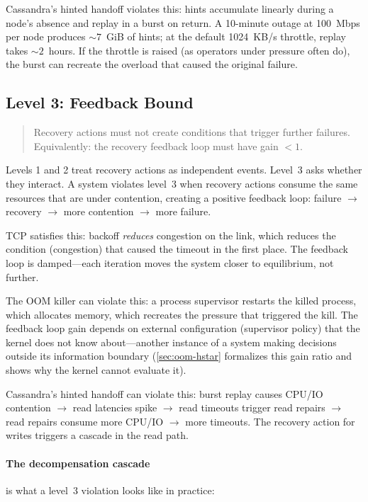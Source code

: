 \documentclass[11pt]{article}
\begin{document}
Cassandra's hinted handoff violates this: hints accumulate linearly during a
node's absence and replay in a burst on return. A 10-minute outage at 100~Mbps
per node produces ${\sim}7$~GiB of hints; at the default 1024~KB/s throttle,
replay takes ${\sim}2$~hours. If the throttle is raised (as operators under
pressure often do), the burst can recreate the overload that caused the original
failure.

\subsection{Level 3: Feedback Bound}

\begin{quote}
Recovery actions must not create conditions that trigger further failures.
Equivalently: the recovery feedback loop must have gain $< 1$.
\end{quote}

Levels 1 and 2 treat recovery actions as independent events. Level~3 asks
whether they interact. A system violates level~3 when recovery actions consume
the same resources that are under contention, creating a positive feedback loop:
failure $\to$ recovery $\to$ more contention $\to$ more failure.

TCP satisfies this: backoff \emph{reduces} congestion on the link, which reduces
the condition (congestion) that caused the timeout in the first place. The
feedback loop is damped---each iteration moves the system closer to equilibrium,
not further.

The OOM killer can violate this: a process supervisor restarts the killed
process, which allocates memory, which recreates the pressure that triggered the
kill. The feedback loop gain depends on external configuration (supervisor
policy) that the kernel does not know about---another instance of a system making
decisions outside its information boundary (\cref{sec:oom-hstar} formalizes
this gain ratio and shows why the kernel cannot evaluate it).

Cassandra's hinted handoff can violate this: burst replay causes CPU/IO
contention $\to$ read latencies spike $\to$ read timeouts trigger read repairs
$\to$ read repairs consume more CPU/IO $\to$ more timeouts. The recovery action
for writes triggers a cascade in the read path.

\paragraph{The decompensation cascade} is what a level~3 violation looks like in
practice:
\end{document}
